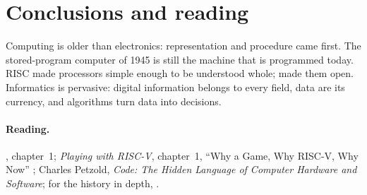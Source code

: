 \section{Conclusions and reading}

Computing is older than electronics: representation and procedure came first.
The stored-program computer of 1945 is still the machine that is programmed
today. RISC made processors simple enough to be understood whole; \riscv made
them open. Informatics is pervasive: digital information belongs to every
field, data are its currency, and algorithms turn data into decisions.

\paragraph{Reading.} \citet{patterson2020}, chapter~1; \emph{Playing with
RISC-V}, chapter~1, ``Why a Game, Why RISC-V, Why Now''
\citep{prg32textbook}; Charles Petzold, \emph{Code: The Hidden Language of
Computer Hardware and Software}; for the history in depth,
\citet{ceruzzi2003}.
